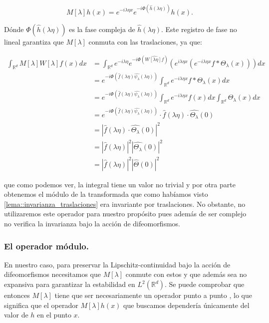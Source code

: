 \begin{equation}
  M[\lambda]h(x)=e^{-i\lambda\eta x} e^{-i \Phi(\widehat{h}(\lambda\eta))}h(x).
\end{equation}

\noindent Dónde $\Phi(\widehat{h}(\lambda\eta))$ es la fase compleja de $\widehat{h}(\lambda\eta)$. Este registro de fase no lineal garantiza que $M[\lambda]$ conmuta con las traslaciones, ya que: 


\begin{align*}
  \int_{\mathbb{R}^d} M[\lambda]W[\lambda] f(x) dx &= \int_{\mathbb{R}^d} e^{-i\lambda \eta} e^{-i \Phi (\widehat{W[\lambda\eta]f})} \left( e^{i\lambda\eta x} \left( e^{-i\lambda\eta x} f \ast \Theta_\lambda (x)\right)\right) dx \\
  &= e^{-i \Phi (\widehat{f}(\lambda\eta)\widehat{\psi_\lambda}(\lambda\eta))} \int_{\mathbb{R}^d} e^{-i\lambda\eta x} f \ast \Theta_\lambda (x) dx \\
  &=e^{-i \Phi (\widehat{f}(\lambda\eta)\widehat{\psi_\lambda}(\lambda\eta))} \int_{\mathbb{R}^d}e^{-i\lambda\eta x} f(x) dx  \int_{\mathbb{R}^d}\Theta_\lambda (x) dx  \\
  &=e^{-i \Phi (\widehat{f}(\lambda\eta)\widehat{\psi_\lambda}(\lambda\eta))} \cdot \widehat{f}(\lambda\eta) \cdot  \widehat{\Theta_\lambda}(0)\\
  &=\left| \widehat{f}(\lambda\eta) \cdot  \widehat{\Theta_\lambda}(0) \right|^2 \\
  &=\left| \widehat{f}(\lambda\eta)\right|^2 \left| \widehat{\Theta_\lambda}(0) \right|^2  \\
  &=\left| \widehat{f}(\lambda\eta)\right|^2 \left| \widehat{\Theta}(0) \right|^2 
\end{align*}

\noindent que como podemos ver, la integral tiene un valor no trivial y por otra parte obtenemos el módulo de la transformada que como habíamos visto \autoref{lema::invarianza_traslaciones} era invariante por traslaciones. No obstante, no utilizaremos este operador para nuestro propósito pues además de ser complejo no verifica la invarianza bajo la acción de difeomorfismos.

\subsubsection{El operador módulo.}

\noindent En nuestro caso, para preservar la Lipschitz-continuidad bajo la acción de difeomorfismos necesitamos que $M[\lambda]$ conmute con estos y que además sea no expansiva para garantizar la estabilidad en $L^2(\mathbb{R}^d)$. Se puede comprobar que entonces $M[\lambda]$ tiene que ser necesariamente un operador punto a punto \cite{JBrunaOperatorsCommutingDiff}, lo que significa que el operador $M[\lambda]h(x)$ que buscamos dependería únicamente del valor de $h$ en el punto $x$.

